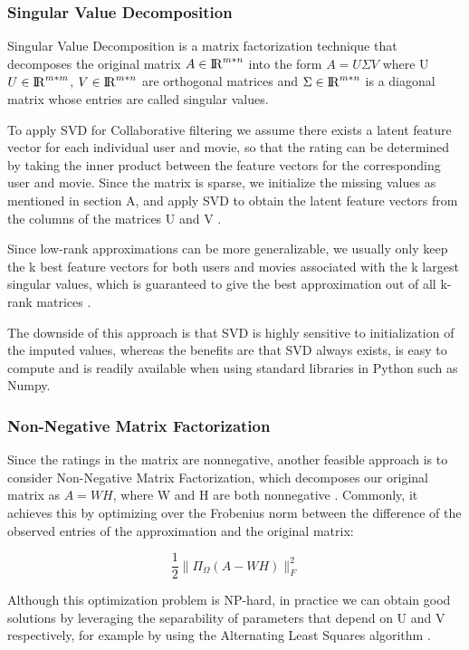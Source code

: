 \documentclass[10pt,conference,compsocconf]{IEEEtran}
\begin{document}
    \subsubsection{Singular Value Decomposition}
    
    Singular Value Decomposition is a matrix factorization technique that decomposes the original matrix $A \in {\rm I\!R}^{m*n} $ into the form $ A = U \Sigma V $ where U  $U \in {\rm I\!R}^{m*m}$,  $V  \in {\rm I\!R}^{m*n}$ are orthogonal matrices and $\Sigma \in {\rm I\!R}^{m*n}$ is a diagonal matrix whose entries are called singular values.   
    
    To apply SVD for Collaborative filtering we assume there exists a latent feature vector for each individual user and movie, so that the rating can be determined by taking the inner product between the feature vectors for the corresponding user and movie. Since the matrix is sparse, we initialize the missing values as mentioned in section A, and apply SVD to obtain the latent feature vectors from the columns of the matrices U and V \cite{svd}. 
    
    Since low-rank approximations can be more generalizable, we usually only keep the k best feature vectors for both users and movies associated with the k largest singular values, which is guaranteed to give the best approximation out of all k-rank matrices \cite{Eckart1936}.
    
    The downside of this approach is that SVD is highly sensitive to initialization of the imputed values, whereas the benefits are that SVD always exists, is easy to compute and is readily available when using standard libraries in Python such as Numpy.

    \subsubsection{Non-Negative Matrix Factorization}
    
    Since the ratings in the matrix are nonnegative, another feasible approach is to consider Non-Negative Matrix Factorization, which decomposes our original matrix as $A = WH$, where W and H are both nonnegative \cite{gillis2014nonnegative}. Commonly, it achieves this by optimizing over the Frobenius norm between the difference of the observed entries of the approximation and the original matrix:
    
    $$ \frac{1}{2}\|\Pi_{\Omega}(A - WH)\|^2_F$$
    
    Although this optimization problem is NP-hard, in practice we can obtain good solutions by leveraging the separability of parameters that depend on U and V respectively, for example by using the Alternating Least Squares algorithm \cite{als}.
\end{document}
